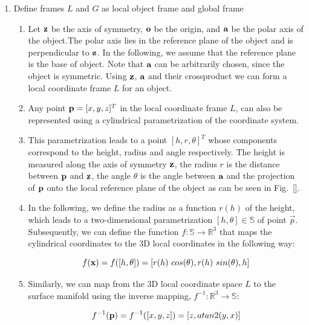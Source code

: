\documentclass{aamas2015}
\begin{document}
\begin{enumerate}
	\item Define frames $L$ and $G$ as local object frame and global frame
	\begin{enumerate}
		\item 
		Let $\textbf{z}$ be the axis of symmetry, $\textbf{o}$ be the origin, and $\textbf{a}$ be the polar axis of the object.The polar axis lies in the reference plane of the object and is perpendicular to $\textbf{z}$. In the following, we assume that the reference plane is the base of object. Note that $\textbf{a}$ can be arbitrarily chosen, since the object is symmetric. Using $\textbf{z}$, $\textbf{a}$ and their crossproduct we can form a local coordinate frame $L$ for an object.
		
		\item Any point $\textbf{p} = [x,y,z]^T$ in the local coordinate frame $L$, can also be represented using a cylindrical parametrization of the coordinate system. 
		
		\item This parametrization leads to a point $[h, r, \theta]^T$ whose components correspond to the height, radius and angle respectively. The height is measured along the axis of symmetry $\textbf{z}$, the radius $r$ is the distance between $\textbf{p}$ and $\textbf{z}$, the angle $\theta$ is the angle between $\textbf{a}$ and the projection of $\textbf{p} $ onto the local reference plane of the object as can be seen in Fig.~\ref{}. 
		
		\item In the following, we define the radius as a function $r(h)$ of the height, which leads to a two-dimensional parametrization $[h, \theta] \in \mathbb{S}$ of point $\vec{p}$. Subsequently, we can define the function $f: \mathbb{S} \rightarrow \mathbb{R}^3$ that maps the cylindrical coordinates to the 3D local coordinates in the following way:
		
		\begin{equation}
			f(\textbf{x}) = f([h, \theta]) = [r(h) ~ cos(\theta), r(h) ~ sin(\theta), h]
		\end{equation}
		
		\item Similarly, we can map from the 3D local coordinate space $L$ to the 
		surface manifold using the inverse mapping, $f^{-1}: \mathbb{R}^3 \rightarrow \mathbb{S}$:
		
		\begin{equation}
			f^{-1}(\textbf{p}) = f^{-1}([x,y,z]) = [z, atan2(y,x)]
		\end{equation}
		

\end{enumerate}
\end{enumerate}
\end{document}
